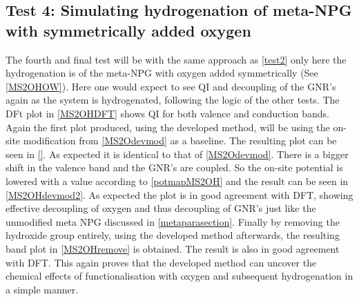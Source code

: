 \subsection{Test 4: Simulating hydrogenation of meta-NPG with symmetrically added oxygen}\label{test4}
The fourth and final test will be with the same approach as \cref{test2} only here the hydrogenation is of the meta-NPG with oxygen added symmetrically (See \cref{MS2OHOW}). Here one would expect to see QI and decoupling of the GNR's again as the system is hydrogenated, following the logic of the other tests. The DFt plot in \cref{MS2OHDFT} shows QI for both valence and conduction bands. Again the first plot produced, using the developed method, will be using the on-site modification from \cref{MS2Odevmod} as a baseline. The resulting plot can be seen in \cref{}. As expected it is identical to that of \cref{MS2Odevmod}. There is a bigger shift in the valence band and the GNR's are coupled. So the on-site potential is lowered with a value according to \cref{potmapMS2OH} and the result can be seen in \cref{MS2OHdevmod2}. As expected the plot is in good agreement with DFT, showing effective decoupling of oxygen and thus decoupling of GNR's just like the unmodified meta NPG discussed in \cref{metaparasection}. Finally by removing the hydroxide group entirely, using the developed method afterwards, the resulting band plot in \cref{MS2OHremove} is obtained. The result is also in good agreement with DFT. This again proves that the developed method can uncover the chemical effects of functionalisation with oxygen and subsequent hydrogenation in a simple manner.
